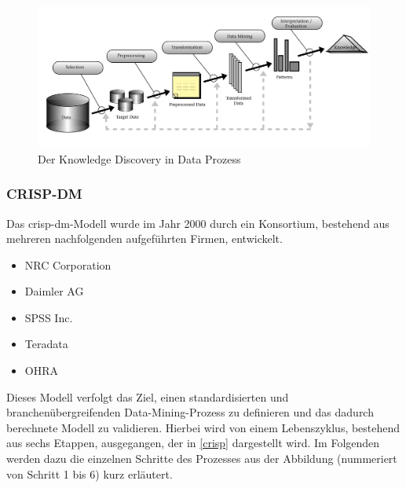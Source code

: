 \begin{figure}[H]
\centering
\includegraphics[scale=0.85]{se-wa-jpg/kdd}
\caption[Der Knowledge Discovery in Data Prozess]{Der Knowledge Discovery in Data Prozess\protect\footnotemark}
\label{kddpic}
\end{figure}


\subsubsection{CRISP-DM}
Das \gls{crisp-dm}-Modell wurde im Jahr 2000 durch ein Konsortium, bestehend aus mehreren nachfolgenden aufgeführten Firmen, entwickelt.

\begin{itemize}
\item NRC Corporation
\item Daimler AG
\item SPSS Inc.
\item Teradata 
\item OHRA
\end{itemize}

Dieses Modell verfolgt das Ziel, einen standardisierten und branchenübergreifenden Data-Mining-Prozess zu definieren und das dadurch berechnete Modell zu validieren. Hierbei wird von einem Lebenszyklus, bestehend aus sechs Etappen, ausgegangen, der in \vref{crisp} dargestellt wird. Im Folgenden werden dazu die einzelnen Schritte des Prozesses aus der Abbildung (nummeriert von Schritt 1 bis 6) kurz erläutert.

